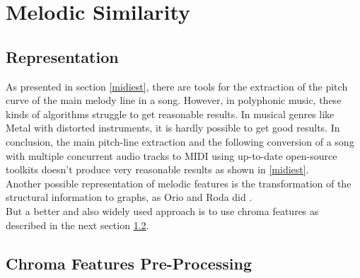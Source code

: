 \newpage

\section{Melodic Similarity}\label{melsimc}

\subsection{Representation}

As presented in section \ref{midiest}, there are tools for the extraction of the pitch curve of the main melody line in a song. However, in polyphonic music, these kinds of algorithms struggle to get reasonable results. %
In musical genres like Metal with distorted instruments, it is hardly possible to get good results. 
In conclusion, the main pitch-line extraction and the following conversion of a song with multiple concurrent audio tracks to MIDI using up-to-date open-source toolkits doesn't produce very reasonable results as shown in \ref{midiest}.\\
Another possible representation of melodic features is the transformation of the structural information to graphs, as Orio and Roda did \cite{graph1}.\\ 
But a better and also widely used approach is to use chroma features as described in the next section \ref{chromafeat}.

\subsection{Chroma Features Pre-Processing}\label{chromafeat}

